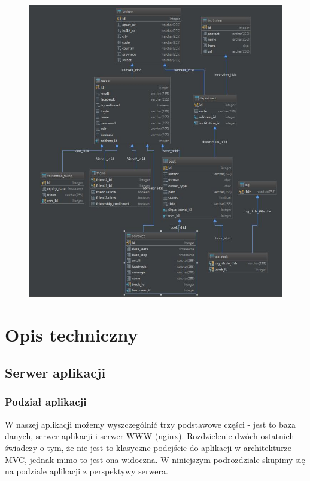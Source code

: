 \documentclass{report}
\begin{document}
			\begin{figure}[!htb]
				\centering
				\includegraphics[width=1.\textwidth]{bookaDB.jpg}
			\end{figure}

\chapter{Opis techniczny}

	\section{Serwer aplikacji}
	
		\subsection{Podział aplikacji}

			W naszej aplikacji możemy wyszczególnić trzy podstawowe części - jest to baza danych, serwer aplikacji  i serwer WWW (nginx). Rozdzielenie dwóch ostatnich świadczy o tym, że nie jest to klasyczne podejście do aplikacji w architekturze MVC, jednak mimo to jest ona widoczna. W niniejszym podrozdziale skupimy się na podziale aplikacji z perspektywy serwera.
			
\end{document}
